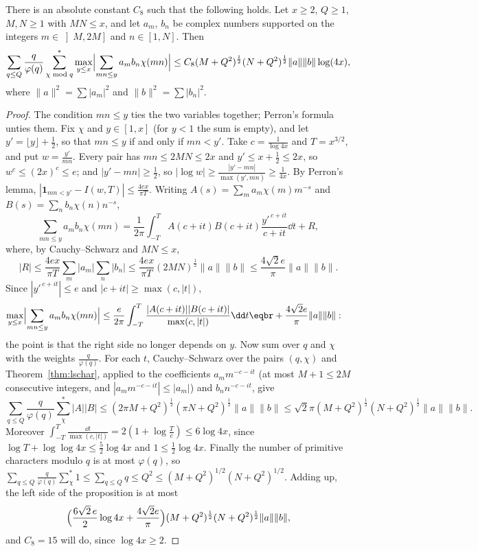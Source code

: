 \begin{proposition}\label{prop:bilinear}
There is an absolute constant $C_8$ such that the following holds. Let $x\ge2$, $Q\ge1$, $M,N\ge1$ with $MN\le x$, and let $a_m$, $b_n$ be complex numbers supported on the integers $m\in\left]M,2M\right]$ and $n\in[1,N]$. Then
\[
\sum_{q\le Q}\frac q{\varphi(q)}\sum^*_{\chi\bmod q}\max_{y\le x}\Bigl|\sum_{mn\le y}a_mb_n\chi(mn)\Bigr|\le C_8(M+Q^2)^{\frac12}(N+Q^2)^{\frac12}\|a\|\|b\|\log(4x),
\]
where $\|a\|^2=\sum|a_m|^2$ and $\|b\|^2=\sum|b_n|^2$.
\end{proposition}
\begin{proof}
The condition $mn\le y$ ties the two variables together; Perron's formula unties them. Fix $\chi$ and $y\in[1,x]$ (for $y<1$ the sum is empty), and let $y'=\lfloor y\rfloor+\frac12$, so that $mn\le y$ if and only if $mn<y'$. Take $c=\frac1{\log4x}$ and $T=x^{3/2}$, and put $w=\frac{y'}{mn}$. Every pair has $mn\le2MN\le2x$ and $y'\le x+\frac12\le2x$, so $w^c\le(2x)^c\le e$; and $|y'-mn|\ge\frac12$, so $|\log w|\ge\frac{|y'-mn|}{\max(y',mn)}\ge\frac1{4x}$. By Perron's lemma, $|\mathbf 1_{mn<y'}-I(w,T)|\le\frac{4ex}{\pi T}$. Writing $A(s)=\sum_ma_m\chi(m)m^{-s}$ and $B(s)=\sum_nb_n\chi(n)n^{-s}$,
\[
\sum_{mn\le y}a_mb_n\chi(mn)=\frac1{2\pi}\int_{-T}^TA(c+it)B(c+it)\frac{y'^{\,c+it}}{c+it}\dd t+R,
\]
where, by Cauchy--Schwarz and $MN\le x$,
\[
|R|\le\frac{4ex}{\pi T}\sum_m|a_m|\sum_n|b_n|\le\frac{4ex}{\pi T}(2MN)^{\frac12}\|a\|\|b\|\le\frac{4\sqrt2e}\pi\|a\|\|b\|.
\] Since $|y'^{\,c+it}|\le e$ and $|c+it|\ge\max(c,|t|)$,
\[
\begin{aligned}\max_{y\le x}\Bigl|\sum_{mn\le y}a_mb_n\chi(mn)\Bigr|&\le\frac e{2\pi}\int_{-T}^T\frac{|A(c+it)||B(c+it)|}{\max(c,|t|)}\dd t\eqbr+\frac{4\sqrt2e}\pi\|a\|\|b\|:\end{aligned}
\]
the point is that the right side no longer depends on $y$. Now sum over $q$ and $\chi$ with the weights $\frac q{\varphi(q)}$. For each $t$, Cauchy--Schwarz over the pairs $(q,\chi)$ and Theorem~\ref{thm:lschar}, applied to the coefficients $a_mm^{-c-it}$ (at most $M+1\le2M$ consecutive integers, and $|a_mm^{-c-it}|\le|a_m|$) and $b_nn^{-c-it}$, give
\[
\sum_{q\le Q}\frac q{\varphi(q)}\sum^*_\chi|A||B|\le(2\pi M+Q^2)^{\frac12}(\pi N+Q^2)^{\frac12}\|a\|\|b\|\le\sqrt2\pi(M+Q^2)^{\frac12}(N+Q^2)^{\frac12}\|a\|\|b\|.
\]
Moreover $\int_{-T}^T\frac{\dd t}{\max(c,|t|)}=2(1+\log\frac Tc)\le6\log4x$, since $\log T+\log\log4x\le\frac52\log4x$ and $1\le\frac12\log4x$. Finally the number of primitive characters modulo $q$ is at most $\varphi(q)$, so $\sum_{q\le Q}\frac q{\varphi(q)}\sum^*_\chi1\le\sum_{q\le Q}q\le Q^2\le(M+Q^2)^{1/2}(N+Q^2)^{1/2}$. Adding up, the left side of the proposition is at most
\[
\Bigl(\frac{6\sqrt2\,e}{2}\log4x+\frac{4\sqrt2e}\pi\Bigr)(M+Q^2)^{\frac12}(N+Q^2)^{\frac12}\|a\|\|b\|,
\]
and $C_8=15$ will do, since $\log4x\ge2$.
\end{proof}

